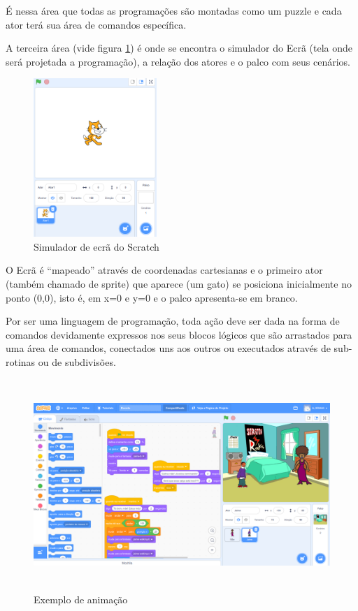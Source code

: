 \documentclass[12pt, openright, a4paper, brazil, english, french, spanish, bibjustif, openany, oneside]{abntex2}
\begin{document}
É nessa área que todas as programações são montadas como um puzzle e cada ator terá sua área de comandos específica.


A terceira área (vide figura \ref{scr4}) é onde se encontra o simulador do Ecrã (tela onde será projetada a programação), a relação dos atores e o palco com seus cenários.

\begin{figure}[H]

    \center
    \caption{Simulador de ecrã do Scratch \label{scr4}}
    \includegraphics[height=6cm]{scratch4.png}
    
\end{figure}

O Ecrã é ``mapeado'' através de coordenadas cartesianas e o primeiro ator (também chamado de sprite) que aparece (um gato) se posiciona inicialmente no ponto (0,0), isto é, em x=0 e y=0 e o palco apresenta-se em branco.


Por ser uma linguagem de programação, toda ação deve ser dada na forma de comandos devidamente expressos nos seus blocos lógicos que são arrastados para uma área de comandos, conectados uns aos outros ou executados através de sub-rotinas ou de subdivisões. 

\begin{figure}[H]

    \center
    \caption{Exemplo de animação \label{exemploani4}}
    \includegraphics[height=8cm]{exemploani.png}
    
\end{figure}
 
\end{document}
